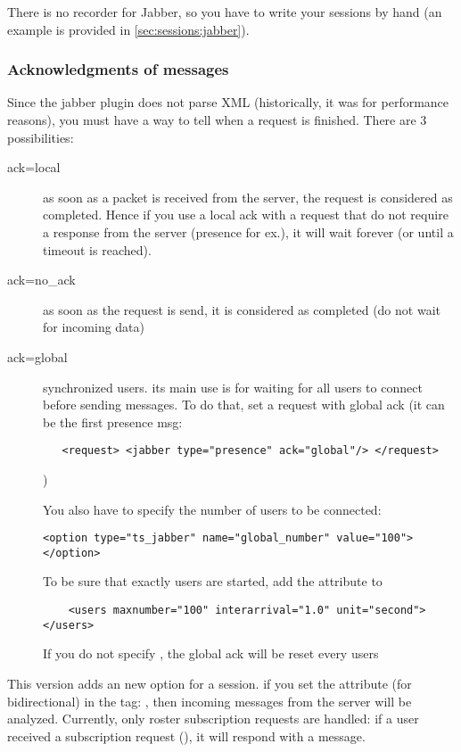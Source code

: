 \documentclass{IDXDOC-en}
\begin{document}
There is no recorder for Jabber, so you have to write your sessions by
hand (an example is provided in \ref{sec:sessions:jabber}).

\subsubsection{Acknowledgments of messages}

Since the jabber plugin does not parse XML (historically, it was for
performance reasons), you must have a way to tell when a request is
finished. There are 3 possibilities:

\begin{description}
 \item[ack=local] as soon as a packet is received from the server, the
request is considered as completed. Hence if you use a local ack with a request
that do not require a response from the server (presence for ex.), it
 will wait forever (or until a timeout is reached).
 \item[ack=no\_ack] as soon as the request is send, it is considered as completed (do
not wait for incoming data)
 \item[ack=global] synchronized users. its main use is for waiting for all
users to connect before sending messages. To do that, set a request
with global ack (it can be the first presence msg:

\begin{Verbatim}
   <request> <jabber type="presence" ack="global"/> </request>
\end{Verbatim}
)

You also have to specify the number of users to be connected:

\begin{Verbatim}
<option type="ts_jabber" name="global_number" value="100"></option>
\end{Verbatim}

To be sure that exactly  users are started, add the
 attribute to 

\begin{Verbatim}
    <users maxnumber="100" interarrival="1.0" unit="second"></users>
\end{Verbatim}

If you do not specify , the global ack will be reset every
 users
\end{description}

\label{bidi:presence}
 This version adds an new option for a
session. if you set the attribute  (for bidirectional)
in the  tag: ,
then incoming messages from the server will be analyzed. Currently,
only roster subscription requests are handled: if a user received a
subscription request (), it
will respond with a 
message.
\end{document}
